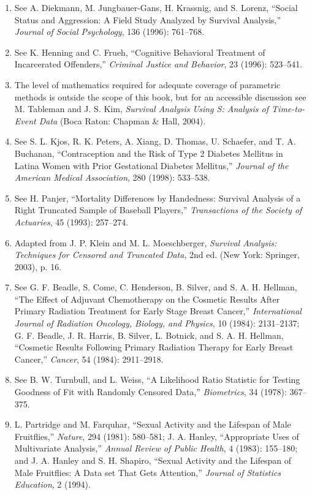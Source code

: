 \documentclass[
]{book}
\begin{document}
\begin{enumerate}
\item See A. Diekmann, M. Jungbauer-Gans, H. Krassnig, and S. Lorenz, “Social Status and Aggression: A Field Study Analyzed by Survival Analysis,” \textit{Journal of Social Psychology}, 136 (1996): 761–768.
\item See K. Henning and C. Frueh, “Cognitive Behavioral Treatment of Incarcerated Offenders,” \textit{Criminal Justice and Behavior}, 23 (1996): 523–541.
\item The level of mathematics required for adequate coverage of parametric methods is outside the scope of this book, but for an accessible discussion see M. Tableman and J. S. Kim, \textit{Survival Analysis Using S: Analysis of Time-to-Event Data} (Boca Raton: Chapman \& Hall, 2004).
\item See S. L. Kjos, R. K. Peters, A. Xiang, D. Thomas, U. Schaefer, and T. A. Buchanan, “Contraception and the Risk of Type 2 Diabetes Mellitus in Latina Women with Prior Gestational Diabetes Mellitus,” \textit{Journal of the American Medical Association}, 280 (1998): 533–538.
\item See H. Panjer, “Mortality Differences by Handedness: Survival Analysis of a Right Truncated Sample of Baseball Players,” \textit{Transactions of the Society of Actuaries}, 45 (1993): 257–274.
\item Adapted from J. P. Klein and M. L. Moeschberger, \textit{Survival Analysis: Techniques for Censored and Truncated Data}, 2nd ed. (New York: Springer, 2003), p. 16.
\item See G. F. Beadle, S. Come, C. Henderson, B. Silver, and S. A. H. Hellman, “The Effect of Adjuvant Chemotherapy on the Cosmetic Results After Primary Radiation Treatment for Early Stage Breast Cancer,” \textit{International Journal of Radiation Oncology, Biology, and Physics}, 10 (1984): 2131–2137; G. F. Beadle, J. R. Harris, B. Silver, L. Botnick, and S. A. H. Hellman, “Cosmetic Results Following Primary Radiation Therapy for Early Breast Cancer,” \textit{Cancer}, 54 (1984): 2911–2918.
\item See B. W. Turnbull, and L. Weiss, “A Likelihood Ratio Statistic for Testing Goodness of Fit with Randomly Censored Data,” \textit{Biometrics}, 34 (1978): 367–375.
\item L. Partridge and M. Farquhar, “Sexual Activity and the Lifespan of Male Fruitflies,” \textit{Nature}, 294 (1981): 580–581; J. A. Hanley, “Appropriate Uses of Multivariate Analysis,” \textit{Annual Review of Public Health}, 4 (1983): 155–180; and J. A. Hanley and S. H. Shapiro, “Sexual Activity and the Lifespan of Male Fruitflies: A Data set That Gets Attention,” \textit{Journal of Statistics Education}, 2 (1994).

\end{enumerate}
\end{document}
